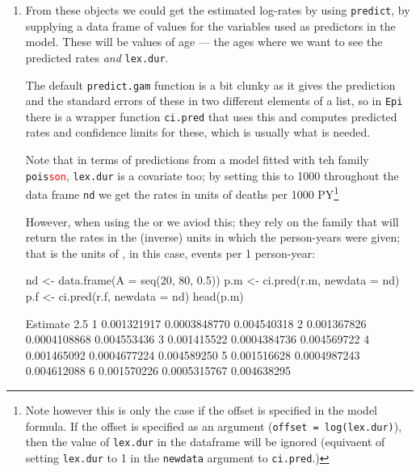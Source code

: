 \begin{enumerate}[resume]

\item From these objects we could get the estimated log-rates by using
  \texttt{predict}, by supplying a data frame of values for the
  variables used as predictors in the model. These will be values of
  age --- the ages where we want to see the predicted rates \emph{and}
  \texttt{lex.dur}.

  The default \texttt{predict.gam} function is a bit clunky as it
  gives the prediction and the standard errors of these in two different
  elements of a list, so in \texttt{Epi} there is a wrapper function
  \texttt{ci.pred} that uses this and computes predicted rates and
  confidence limits for these, which is usually what is needed.

  Note that in terms of predictions from a model fitted with teh
  family \texttt{pois\textcolor{red}{son}}, \texttt{lex.dur} is a covariate too;
  by setting this to 1000 throughout the data frame \texttt{nd} we get
  the rates in units of deaths per 1000 PY\footnote{Note however this is only
  the case if the offset is specified in the model formula. If the offset is
  specified as an argument (\texttt{offset = log(lex.dur)}), then the
  value of \texttt{lex.dur} in the dataframe will be ignored
  (equivaent of setting \texttt{lex.dur} to 1 in the \texttt{newdata}
  argument to \texttt{ci.pred}.)}

However, when using the  or  we aviod
this; they rely on the  family that
will return the rates in the (inverse) units in which the person-years
were given; that is the units of , in this case, events
per 1 person-year:
\begin{Schunk}
\begin{Sinput}
 nd <-  data.frame(A = seq(20, 80, 0.5))
 p.m <- ci.pred(r.m, newdata = nd)
 p.f <- ci.pred(r.f, newdata = nd)
 head(p.m)
\end{Sinput}
\begin{Soutput}
     Estimate         2.5%       97.5%
1 0.001321917 0.0003848770 0.004540318
2 0.001367826 0.0004108868 0.004553436
3 0.001415522 0.0004384736 0.004569722
4 0.001465092 0.0004677224 0.004589250
5 0.001516628 0.0004987243 0.004612088
6 0.001570226 0.0005315767 0.004638295
\end{Soutput}
\end{Schunk}


\end{enumerate}
